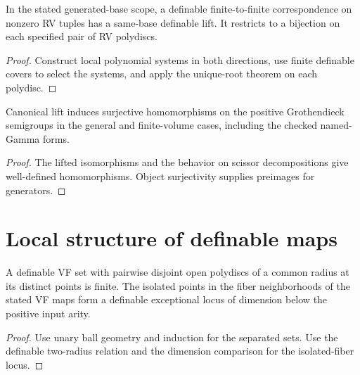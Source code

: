 \begin{theorem}
\label{thm:correspondence-lift}
\leanok
In the stated generated-base scope, a definable finite-to-finite
correspondence on nonzero RV tuples has a same-base definable lift.
It restricts to a bijection on each specified pair of RV polydiscs.
\end{theorem}
\begin{proof}
\leanok
{}
Construct local polynomial systems in both directions, use finite
definable covers to select the systems, and apply the unique-root
theorem on each polydisc.
\end{proof}

\begin{corollary}
\label{cor:unmeasured-scissors}
\leanok
Canonical lift induces surjective homomorphisms on the positive
Grothendieck semigroups in the general and finite-volume cases,
including the checked named-Gamma forms.
\end{corollary}
\begin{proof}
\leanok
{}
The lifted isomorphisms and the behavior on scissor decompositions
give well-defined homomorphisms. Object surjectivity supplies
preimages for generators.
\end{proof}

\section{Local structure of definable maps}

\begin{lemma}
\label{lem:isolated-fibers}
\leanok
A definable VF set with pairwise disjoint open polydiscs of a common
radius at its distinct points is finite. The isolated points in the
fiber neighborhoods of the stated VF maps form a definable exceptional
locus of dimension below the positive input arity.
\end{lemma}
\begin{proof}
\leanok
{}
Use unary ball geometry and induction for the separated sets. Use
the definable two-radius relation and the dimension comparison for
the isolated-fiber locus.
\end{proof}

